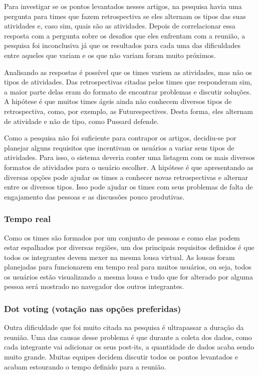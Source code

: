 Para investigar se os pontos levantados nesses artigos, na pesquisa havia uma pergunta para times que fazem retrospectiva se eles alternam os tipos das suas atividades e, caso sim, quais são as atividades. Depois de correlacionar essa resposta com a pergunta sobre os desafios que eles enfrentam com a reunião, a pesquisa foi inconclusiva já que os resultados para cada uma das dificuldades entre aqueles que variam e os que não variam foram muito próximos.

Analisando as respostas é possível que os times variem as atividades, mas não os tipos de atividades. Das retrospectivas citadas pelos times que responderam sim, a maior parte delas eram do formato de encontrar problemas e discutir soluções. A hipótese é que muitos times ágeis ainda não conhecem diversos tipos de retrospectiva, como, por exemplo, as Futurespectives. Desta forma, eles alternam de atividade e não de tipo, como Pussard defende.

Como a pesquisa não foi suficiente para contrapor os artigos, decidiu-se por planejar alguns requisitos que incentivam os usuários a variar seus tipos de atividades. Para isso, o sistema deveria conter uma listagem com os mais diversos formatos de atividades para o usuário escolher. A hipótese é que apresentando as diversas opções pode ajudar os times a conhecer novas retrospectivas e alternar entre os diversos tipos. Isso pode ajudar os times com seus problemas de falta de engajamento das pessoas e as discussões pouco produtivas.

\subsubsection*{Tempo real}

Como os times são formados por um conjunto de pessoas e como elas podem estar espalhados por diversas regiões, um dos principais requisitos definidos é que todos os integrantes devem mexer na mesma lousa virtual. As lousas foram planejadas  para funcionarem em tempo real para muitos usuários, ou seja, todos os usuários estão visualizando a mesma lousa e tudo que for alterado por alguma pessoa será mostrado no navegador dos outros integrantes.

\subsubsection*{Dot voting (votação nas opções preferidas)}

Outra dificuldade que foi muito citada na pesquisa é ultrapassar a duração da reunião. Uma das causas desse problema é que durante a coleta dos dados, como cada integrante vai adicionar os seus post-its, a quantidade de dados acaba sendo muito grande. Muitas equipes decidem discutir todos os pontos levantados e acabam estourando o tempo definido para a reunião.


